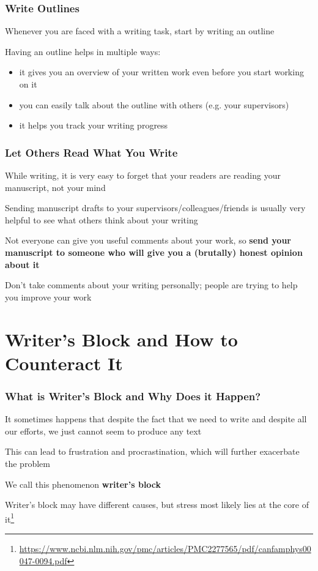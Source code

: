 \documentclass{beamer}
\begin{document}
\begin{frame}
\frametitle{Write Outlines}
    \vspace{-1cm}
    Whenever you are faced with a writing task, start by writing an outline
    \newline

    Having an outline helps in multiple ways:
    \begin{itemize}
        \item it gives you an overview of your written work even before you start working on it
        \item you can easily talk about the outline with others (e.g. your supervisors)
        \item it helps you track your writing progress
    \end{itemize}
\end{frame}

\begin{frame}
\frametitle{Let Others Read What You Write}
    \vspace{-1cm}
    While writing, it is very easy to forget that your readers are reading your manuscript, not your mind
    \newline

    Sending manuscript drafts to your supervisors/colleagues/friends is usually very helpful to see what others think about your writing
    \newline

    Not everyone can give you useful comments about your work, so \textbf{send your manuscript to someone who will give you a (brutally) honest opinion about it}
    \newline

    Don't take comments about your writing personally; people are trying to help you improve your work
\end{frame}

\section{Writer's Block and How to Counteract It}

\begin{frame}
\frametitle{What is Writer's Block and Why Does it Happen?}
    \vspace{-0.5cm}
    It sometimes happens that despite the fact that we need to write and despite all our efforts, we just cannot seem to produce any text
    \newline

    This can lead to frustration and procrastination, which will further exacerbate the problem
    \newline

    We call this phenomenon \textbf{writer's block}
    \newline

    Writer's block may have different causes, but stress most likely lies at the core of it\footnote{\url{https://www.ncbi.nlm.nih.gov/pmc/articles/PMC2277565/pdf/canfamphys00047-0094.pdf}}
\end{frame}
\end{document}
